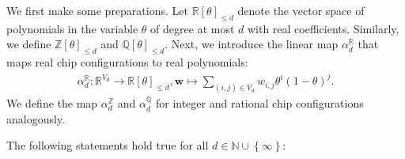We first make some preparations. Let \( \mathbb{R}[\theta]_{\leq d} \) denote the vector space of polynomials in the variable \( \theta \) of degree at most \( d \) with real coefficients. Similarly, we define \( \mathbb{Z}[\theta]_{\leq d} \) and \( \mathbb{Q}[\theta]_{\leq d} \). Next, we introduce the linear map \( \alpha_{d}^{\mathbb R} \) that maps real chip configurations to real polynomials:
\begin{align*}
    \alpha_d^{\mathbb R}: \mathbb{R}^{V_d} \to \mathbb{R}[\theta]_{\leq d}, 
    \mathbf{w} \mapsto \sum_{(i,j) \in V_d} w_{i,j} \theta^{i}(1-\theta)^j.
\end{align*}
We define the map \( \alpha_d^{\mathbb Z} \) and \( \alpha_d^{\mathbb Q} \) for integer and rational chip configurations analogously.

\begin{lemma}\label{lem:kernel-noo}
    The following statements hold true for all \( d \in \mathbb{N} \cup \left\{ \infty \right\} \):
\end{lemma}

